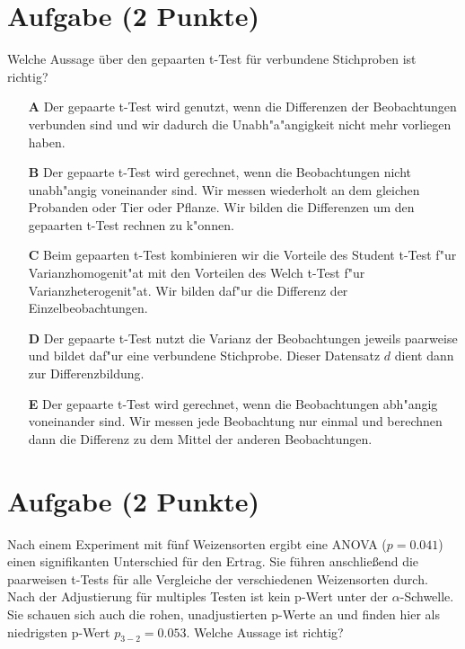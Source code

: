 \documentclass[a4paper, 9pt]{scrartcl}\usepackage[]{graphicx}\usepackage[]{xcolor}
\begin{document}
\section{Aufgabe \hfill (2 Punkte)}

Welche Aussage {\"u}ber den gepaarten t-Test f{\"u}r verbundene Stichproben ist richtig?



\begin{enumerate}
\item [\textbf{A} \msquare] Der gepaarte t-Test wird genutzt, wenn die Differenzen der Beobachtungen verbunden sind und wir dadurch die Unabh{"a}{"a}ngigkeit nicht mehr vorliegen haben.
\item [\textbf{B} \msquare] Der gepaarte t-Test wird gerechnet, wenn die Beobachtungen nicht unabh{"a}ngig voneinander sind. Wir messen wiederholt an dem gleichen Probanden oder Tier oder Pflanze. Wir bilden die Differenzen um den gepaarten t-Test rechnen zu k{"o}nnen.
\item [\textbf{C} \msquare] Beim gepaarten t-Test kombinieren wir die Vorteile des Student t-Test f{"u}r Varianzhomogenit{"a}t mit den Vorteilen des Welch t-Test f{"u}r Varianzheterogenit{"a}t. Wir bilden daf{"u}r die Differenz der Einzelbeobachtungen.
\item [\textbf{D} \msquare] Der gepaarte t-Test nutzt die Varianz der Beobachtungen jeweils paarweise und bildet daf{"u}r eine verbundene Stichprobe. Dieser Datensatz $d$ dient dann zur Differenzbildung.
\item [\textbf{E} \msquare] Der gepaarte t-Test wird gerechnet, wenn die Beobachtungen abh{"a}ngig voneinander sind. Wir messen jede Beobachtung nur einmal und berechnen dann die Differenz zu dem Mittel der anderen Beobachtungen.
\end{enumerate}

\section{Aufgabe \hfill (2 Punkte)}

Nach einem Experiment mit f{\"u}nf Weizensorten ergibt eine ANOVA ($p = 0.041$)
einen signifikanten Unterschied f{\"u}r den Ertrag. Sie f{\"u}hren anschlie{\ss}end die
paarweisen t-Tests f{\"u}r alle Vergleiche der verschiedenen Weizensorten
durch. Nach der Adjustierung f{\"u}r multiples Testen ist kein p-Wert unter der
$\alpha$-Schwelle. Sie schauen sich auch die rohen, unadjustierten p-Werte
an und finden hier als niedrigsten p-Wert $p_{3-2} = 0.053$. Welche Aussage
ist richtig? 
\end{document}
